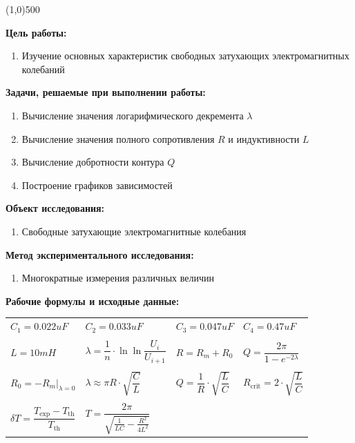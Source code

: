 \documentclass[12pt,a4paper]{report}
\begin{document}
\begin{center}
    \line(1,0){500}
\end{center}
\textbf{Цель работы:}
\begin{enumerate}
    \item Изучение основных характеристик свободных затухающих электромагнитных
    колебаний    
\end{enumerate}
\textbf{Задачи, решаемые при выполнении работы:}
\begin{enumerate}
    \item Вычисление значения логарифмического декремента $\lambda$
    \item Вычисление значения полного сопротивления $R$ и индуктивности $L$
    \item Вычисление добротности контура $Q$
    \item Построение графиков зависимостей
\end{enumerate}
\textbf{Объект исследования:}
\begin{enumerate}
    \item Свободные затухающие электромагнитные колебания
\end{enumerate}
\textbf{Метод экспериментального исследования:}
\begin{enumerate}
    \item Многократные измерения различных величин
\end{enumerate}
\textbf{Рабочие формулы и исходные данные:} \\
\hfill\break
\begin{tabular}{llll}
    $C_1=0.022uF$ & $C_2=0.033uF$ & $C_3=0.047uF$ & $C_4=0.47uF$ \\
    \hspace{4cm} & \hspace{4cm} & \hspace{4cm} & \hspace{4cm} \\
    $L=10mH$ & $\lambda=\dfrac{1}{n}\cdot\ln\ln\dfrac{U_i}{U_{i+1}}$ & $R=R_m+R_0$ & $Q=\dfrac{2\pi}{1-e^{-2\lambda}}$ \\
    \\
    $R_0=-R_m|_{\lambda=0}$ & $\lambda\approx\pi R\cdot\sqrt{\dfrac{C}{L}}$ & $Q=\dfrac{1}{R}\cdot\sqrt{\dfrac{L}{C}}$ & $R_{\text{crit}}=2\cdot\sqrt{\dfrac{L}{C}}$ \\
    \\
    $\delta T=\dfrac{T_\text{exp}-T_\text{th}}{T_\text{th}}$ & $T=\dfrac{2\pi}{\sqrt{\frac{1}{LC}-\frac{R^2}{4L^2}}}$ \\
\end{tabular}
\end{document}
